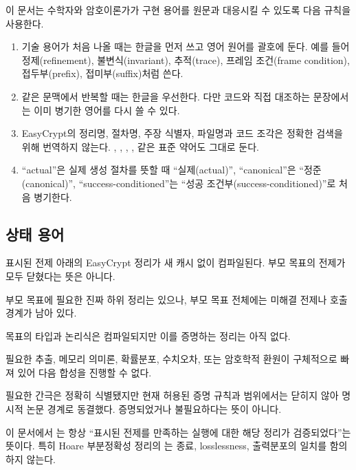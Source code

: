 이 문서는 수학자와 암호이론가가 구현 용어를 원문과 대응시킬 수 있도록 다음
규칙을 사용한다.

\begin{enumerate}
  \item 기술 용어가 처음 나올 때는 한글을 먼저 쓰고 영어 원어를 괄호에 둔다.
        예를 들어 정제(refinement), 불변식(invariant), 추적(trace), 프레임
        조건(frame condition), 접두부(prefix), 접미부(suffix)처럼 쓴다.
  \item 같은 문맥에서 반복할 때는 한글을 우선한다. 다만 코드와 직접 대조하는
        문장에서는 이미 병기한 영어를 다시 쓸 수 있다.
  \item EasyCrypt의 정리명, 절차명, 주장 식별자, 파일명과 코드 조각은 정확한
        검색을 위해 번역하지 않는다. , ,
        , ,  같은 표준 약어도
        그대로 둔다.
  \item ``actual''은 실제 생성 절차를 뜻할 때 ``실제(actual)'', ``canonical''은
        ``정준(canonical)'', ``success-conditioned''는
        ``성공 조건부(success-conditioned)''로 처음 병기한다.
\end{enumerate}

\subsection{상태 용어}

\begin{description}[style=nextline,leftmargin=2.7cm]
  \item[\statusproved]
    표시된 전제 아래의 EasyCrypt 정리가 새 캐시 없이 컴파일된다. 부모 목표의
    전제가 모두 닫혔다는 뜻은 아니다.
  \item[\statuspartial]
    부모 목표에 필요한 진짜 하위 정리는 있으나, 부모 목표 전체에는 미해결
    전제나 호출 경계가 남아 있다.
  \item[\statusspecified]
    목표의 타입과 논리식은 컴파일되지만 이를 증명하는 정리는 아직 없다.
  \item[\statusblocked]
    필요한 추출, 메모리 의미론, 확률분포, 수치오차, 또는 암호학적 환원이
    구체적으로 빠져 있어 다음 합성을 진행할 수 없다.
  \item[\statusdeferred]
    필요한 간극은 정확히 식별됐지만 현재 허용된 증명 규칙과 범위에서는 닫히지
    않아 명시적 논문 경계로 동결했다. 증명되었거나 불필요하다는 뜻이 아니다.
\end{description}

\begin{boundary}
이 문서에서 \statusproved 는 항상 ``표시된 전제를 만족하는 실행에 대한 해당
정리가 검증되었다''는 뜻이다. 특히 Hoare 부분정확성 정리의 \statusproved 는
종료, losslessness, 출력분포의 일치를 함의하지 않는다.
\end{boundary}


